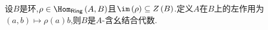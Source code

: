 \begin{proposition}{}{}
	设$B$是环,$\rho\in\Hom_{\mathsf{Ring}}\left(A,B\right)$且$\im\left(\rho\right)\subseteq Z\left(B\right)$.定义$A$在$B$上的左作用为$\left(a,b\right)\mapsto\rho\left(a\right)b$,则$B$是$A$-含幺结合代数.
\end{proposition}



































































